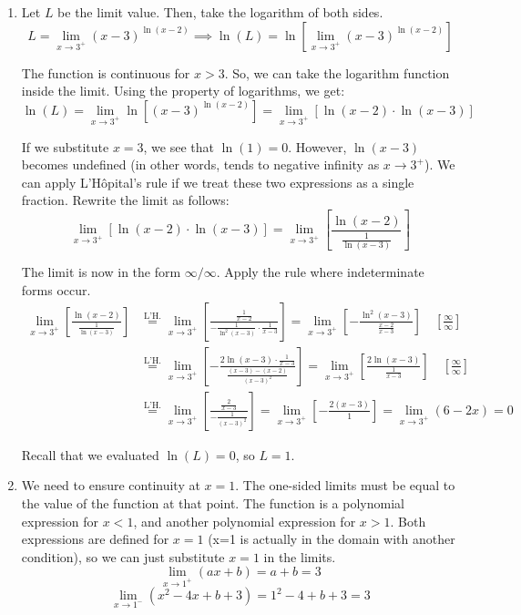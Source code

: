 \documentclass[a4paper, 12pt]{article}
\renewcommand{\headrulewidth}{0pt}
\begin{document}
\newpage
\pagestyle{fancy}
\renewcommand{\headrulewidth}{1pt}


\begin{enumerate}[leftmargin=*,label=\textbf{\arabic*.}]
\item Let $L$ be the limit value. Then, take the logarithm of both sides.
\[L = \lim_{x\to3^+}(x-3)^{\ln(x-2)}\implies\ln(L) = \ln\left[\lim_{x\to3^+}(x-3)^{\ln(x-2)}\right]\]

The function is continuous for $x > 3$. So, we can take the logarithm function inside the limit. Using the property of logarithms, we get:
\[\ln(L) = \lim_{x\to3^+}\ln\left[(x-3)^{\ln(x-2)}\right] = \lim_{x\to3^+}\left[\ln(x-2)\cdot \ln(x-3)\right]\]

If we substitute $x=3$, we see that $\ln(1) = 0$. However, $\ln(x-3)$ becomes undefined (in other words, tends to negative infinity as $x\to3^+$). We can apply L'Hôpital's rule if we treat these two expressions as a single fraction. Rewrite the limit as follows:
\[\lim_{x\to3^+}\left[\ln(x-2) \cdot \ln(x-3)\right] =\lim_{x\to3^+}\left[\frac{\ln(x-2)}{\frac{1}{\ln(x-3)}}\right]  \]

The limit is now in the form $\infty/\infty$. Apply the rule where indeterminate forms occur.
\begin{align*}
    \lim_{x\to3^+}\left[\frac{\ln(x-2)}{\frac{1}{\ln(x-3)}}\right] &\overset{\text{L'H.}}{=} \lim_{x\to3^+} \left[\frac{\frac{1}{x-2}}{-\frac{1}{\ln^2(x-3)}\cdot {\frac{1}{x-3}}}\right] = \lim_{x\to3^+} \left[-\frac{\ln^2(x-3)}{\frac{x-2}{x-3}}\right] \quad \left[\frac{\infty}{\infty}\right] \\[1em]
    &\overset{\text{L'H.}}{=} \lim_{x\to3^+}\left[-\frac{2\ln(x-3)\cdot\frac{1}{x-3}}{\frac{(x-3) -(x-2)}{(x-3)^2}}\right] = \lim_{x\to3^+} \left[\frac{2\ln(x-3)}{\frac{1}{x-3}}\right] \quad \left[\frac{\infty}{\infty}\right] \\[1em]
    &\overset{\text{L'H.}}{=} \lim_{x\to3^+} \left[\frac{\frac{2}{x-3}}{-\frac{1}{(x-3)^2}}\right] = \lim_{x\to3^+} \left[-\frac{2(x-3)}{1}\right]=\lim_{x\to3^+} (6-2x)=0
\end{align*}

Recall that we evaluated $\ln(L) = 0$, so $\boxed{L = 1}$.

\item We need to ensure continuity at $x=1$. The one-sided limits must be equal to the value of the function at that point. The function is a polynomial expression for $x<1$, and another polynomial expression for $x>1$. Both expressions are defined for $x=1$ (x=1 is actually in the domain with another condition), so we can just substitute $x=1$ in the limits.
\[\lim_{x\to1^+} (ax+b) = a+b = 3\]
\[\lim_{x\to1^-} (x^2-4x+b+3) = 1^2 -4 +b+3 =  3\]


\end{enumerate}
\end{document}
